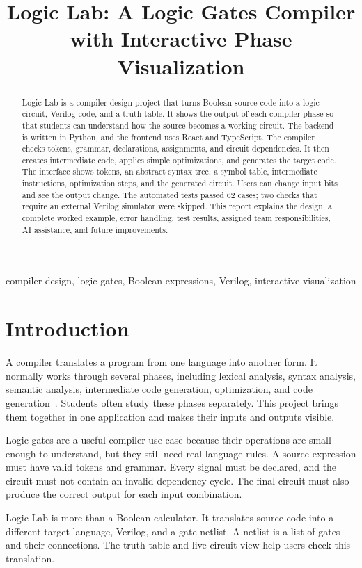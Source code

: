 \documentclass[conference]{IEEEtran}
\title{Logic Lab: A Logic Gates Compiler with Interactive Phase Visualization}
\author{\IEEEauthorblockN{Dibyajyoti, Rhythm Jain, Prince Sahoo, Ritik Raj, A M YEESHU}
\IEEEauthorblockA{Team ABC --- Compiler Design Project\\
CS \& AI, Rishihood University}}
\begin{document}
\maketitle
\begin{abstract}
Logic Lab is a compiler design project that turns Boolean source code into a logic circuit, Verilog code, and a truth table. It shows the output of each compiler phase so that students can understand how the source becomes a working circuit. The backend is written in Python, and the frontend uses React and TypeScript. The compiler checks tokens, grammar, declarations, assignments, and circuit dependencies. It then creates intermediate code, applies simple optimizations, and generates the target code. The interface shows tokens, an abstract syntax tree, a symbol table, intermediate instructions, optimization steps, and the generated circuit. Users can change input bits and see the output change. The automated tests passed 62 cases; two checks that require an external Verilog simulator were skipped. This report explains the design, a complete worked example, error handling, test results, assigned team responsibilities, AI assistance, and future improvements.
\end{abstract}
\begin{IEEEkeywords}
compiler design, logic gates, Boolean expressions, Verilog, interactive visualization
\end{IEEEkeywords}

\section{Introduction}
A compiler translates a program from one language into another form. It normally works through several phases, including lexical analysis, syntax analysis, semantic analysis, intermediate code generation, optimization, and code generation~\cite{aho}. Students often study these phases separately. This project brings them together in one application and makes their inputs and outputs visible.

Logic gates are a useful compiler use case because their operations are small enough to understand, but they still need real language rules. A source expression must have valid tokens and grammar. Every signal must be declared, and the circuit must not contain an invalid dependency cycle. The final circuit must also produce the correct output for each input combination.

Logic Lab is more than a Boolean calculator. It translates source code into a different target language, Verilog, and a gate netlist. A netlist is a list of gates and their connections. The truth table and live circuit view help users check this translation.
\end{document}

